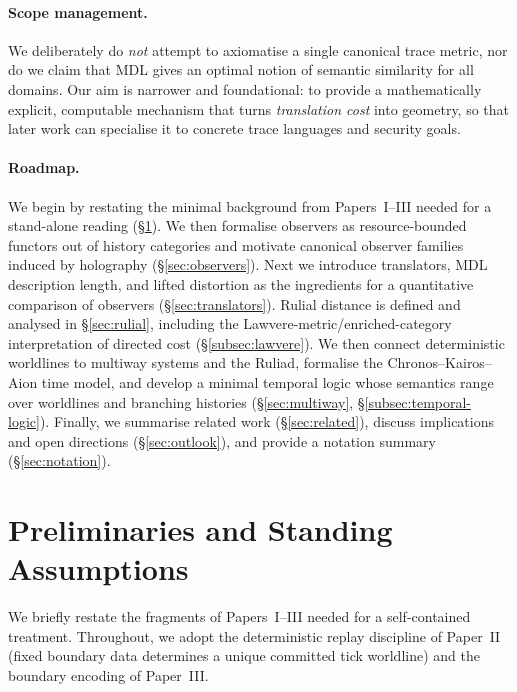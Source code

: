 \documentclass{aion}
\providecommand{\sectionbreak}{\clearpage}
\begin{document}
\paragraph{Scope management.}
We deliberately do \emph{not} attempt to axiomatise a single canonical trace metric,
nor do we claim that MDL gives an optimal notion of semantic similarity for all domains.
Our aim is narrower and foundational: to provide a mathematically explicit, computable mechanism that turns
\emph{translation cost} into geometry, so that later work can specialise it to concrete trace languages and security goals.

\paragraph{Roadmap.}
We begin by restating the minimal background from Papers~I--III needed for a stand-alone reading (\S\ref{sec:prelim}).
We then formalise observers as resource-bounded functors out of history categories and motivate canonical observer families
induced by holography (\S\ref{sec:observers}).
Next we introduce translators, MDL description length, and lifted distortion as the ingredients for a quantitative comparison
of observers (\S\ref{sec:translators}).
Rulial distance is defined and analysed in \S\ref{sec:rulial}, including the Lawvere-metric/enriched-category interpretation of
directed cost (\S\ref{subsec:lawvere}).
We then connect deterministic worldlines to multiway systems and the Ruliad, formalise the Chronos--Kairos--Aion time model,
and develop a minimal temporal logic whose semantics range over worldlines and branching histories (\S\ref{sec:multiway},
\S\ref{subsec:temporal-logic}).
Finally, we summarise related work (\S\ref{sec:related}), discuss implications and open directions (\S\ref{sec:outlook}),
and provide a notation summary (\S\ref{sec:notation}).

\sectionbreak

\section{Preliminaries and Standing Assumptions}
\label{sec:prelim}

We briefly restate the fragments of Papers~I--III needed for a self-contained treatment.
Throughout, we adopt the deterministic replay discipline of Paper~II (fixed boundary data determines a unique committed tick worldline)
and the boundary encoding of Paper~III.
\end{document}
